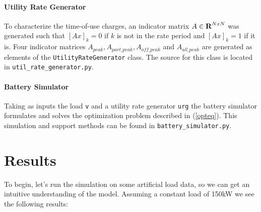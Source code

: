 \documentclass[12pt]{article}
\begin{document}
\paragraph{Utility Rate Generator}
To characterize the time-of-use charges, an indicator matrix $A \in {\mbox{\bf R}}^{NxN}$ was generated such that $[Ax]_k = 0$ if $k$ is not in the rate period and $[Ax]_k = 1 $ if it is. Four indicator matrices $A_{peak}, A_{part\_peak}, A_{off\_peak}$ and $A_{all\_peak}$ are generated as elements of the \texttt{UtilityRateGenerator} class. The source for this class is located in \texttt{util\_rate\_generator.py}.


\paragraph{Battery Simulator}
Taking as inputs the load \texttt{v} and a utility rate generator \texttt{urg} the battery simulator formulates and solves the optimization problem described in (\ref{opteq}). This simulation and support methods can be found in \texttt{battery\_simulator.py}.

\section{Results}
To begin, let's run the simulation on some artificial load data, so we can get an intuitive understanding of the model. Assuming a constant load of 150kW we see the following results:
\end{document}
